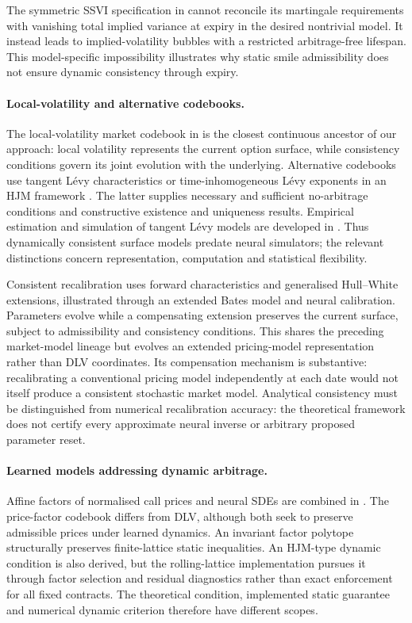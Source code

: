 The symmetric SSVI specification in \cite{elamrani} cannot reconcile its martingale requirements with vanishing total implied variance at expiry in the desired nontrivial model. It instead leads to implied-volatility bubbles with a restricted arbitrage-free lifespan. This model-specific impossibility illustrates why static smile admissibility does not ensure dynamic consistency through expiry.

\paragraph{Local-volatility and alternative codebooks.}
The local-volatility market codebook in \cite{cn2009} is the closest continuous ancestor of our approach: local volatility represents the current option surface, while consistency conditions govern its joint evolution with the underlying. Alternative codebooks use tangent L\'evy characteristics \cite{cn2012} or time-inhomogeneous L\'evy exponents in an HJM framework \cite{kk}. The latter supplies necessary and sufficient no-arbitrage conditions and constructive existence and uniqueness results. Empirical estimation and simulation of tangent L\'evy models are developed in \cite{cmn}. Thus dynamically consistent surface models predate neural simulators; the relevant distinctions concern representation, computation and statistical flexibility.

Consistent recalibration \cite{crc} uses forward characteristics and generalised Hull--White extensions, illustrated through an extended Bates model and neural calibration. Parameters evolve while a compensating extension preserves the current surface, subject to admissibility and consistency conditions. This shares the preceding market-model lineage but evolves an extended pricing-model representation rather than DLV coordinates. Its compensation mechanism is substantive: recalibrating a conventional pricing model independently at each date would not itself produce a consistent stochastic market model. Analytical consistency must be distinguished from numerical recalibration accuracy: the theoretical framework does not certify every approximate neural inverse or arbitrary proposed parameter reset.

\paragraph{Learned models addressing dynamic arbitrage.}
Affine factors of normalised call prices and neural SDEs are combined in \cite{crw}. The price-factor codebook differs from DLV, although both seek to preserve admissible prices under learned dynamics. An invariant factor polytope structurally preserves finite-lattice static inequalities. An HJM-type dynamic condition is also derived, but the rolling-lattice implementation pursues it through factor selection and residual diagnostics rather than exact enforcement for all fixed contracts. The theoretical condition, implemented static guarantee and numerical dynamic criterion therefore have different scopes.

